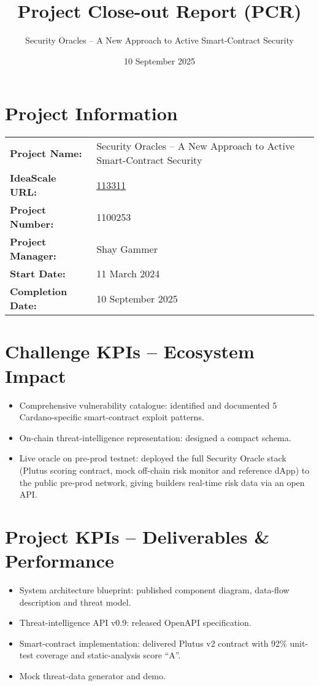 \documentclass[11pt,a4paper]{article}
\title{\textbf{Project Close-out Report (PCR)}}
\author{Security Oracles -- A New Approach to Active Smart-Contract Security}
\date{10 September 2025}
\begin{document}
\maketitle

\section*{Project Information}
\begin{tabular}{ll}
\textbf{Project Name:} & Security Oracles – A New Approach to Active Smart-Contract Security \\
\textbf{IdeaScale URL:} & \href{https://cardano.ideascale.com/c/cardano/idea/113311}{113311} \\
\textbf{Project Number:} & 1100253 \\
\textbf{Project Manager:} & Shay Gammer \\
\textbf{Start Date:} & 11 March 2024 \\
\textbf{Completion Date:} & 10 September 2025 \\
\end{tabular}

\section*{Challenge KPIs – Ecosystem Impact}
\begin{itemize}
  \item Comprehensive vulnerability catalogue: identified and documented 5 Cardano-specific smart-contract exploit patterns.
  \item On-chain threat-intelligence representation: designed a compact schema.
  \item Live oracle on pre-prod testnet: deployed the full Security Oracle stack (Plutus scoring contract, mock off-chain risk monitor and reference dApp) to the public pre-prod network, giving builders real-time risk data via an open API.
\end{itemize}

\section*{Project KPIs – Deliverables \& Performance}
\begin{itemize}
  \item System architecture blueprint: published component diagram, data-flow description and threat model.
  \item Threat-intelligence API v0.9: released OpenAPI specification.
  \item Smart-contract implementation: delivered Plutus v2 contract with 92\% unit-test coverage and static-analysis score ``A''.
  \item Mock threat-data generator and demo.
\end{itemize}
\end{document}
